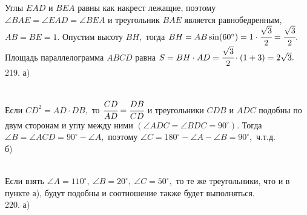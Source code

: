 \documentclass[12pt]{article}
\begin{document}
Углы $EAD$ и $BEA$ равны как накрест лежащие, поэтому $\angle BAE=\angle EAD=\angle BEA$ и треугольник $BAE$ является равнобедренным, $AB=BE=1.$ Опустим высоту $BH,$ тогда $BH=AB\sin(60^\circ)=1\cdot\cfrac{\sqrt{3}}{2}=\cfrac{\sqrt{3}}{2}.$ Площадь параллелограмма $ABCD$ равна $S=BH\cdot AD=\cfrac{\sqrt{3}}{2}\cdot(1+3)=2\sqrt{3}.$\\
219. а)\begin{figure}[ht!]
\end{figure}\\
Если $CD^2=AD\cdot DB,$ то $\cfrac{CD}{AD}=\cfrac{DB}{CD}$ и треугольники $CDB$ и $ADC$ подобны по двум сторонам и углу между ними $(\angle ADC=\angle BDC=90^\circ).$ Тогда $\angle B=\angle ACD=90^\circ-\angle A,$ поэтому $\angle C=180^\circ-\angle A-\angle B=90^\circ,$ ч.т.д.\\
б) \begin{figure}[ht!]
\end{figure}\\
Если взять $\angle A=110^\circ,\ \angle B=20^\circ,\ \angle C=50^\circ,$ то те же треугольники, что и в пункте а), будут подобны и соотношение также будет выполняться.\\
220. а)\begin{figure}[ht!]
\end{figure}\\
\end{document}
